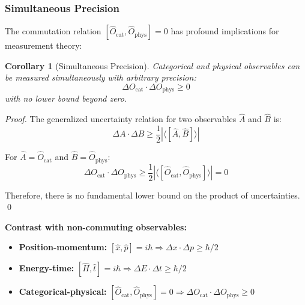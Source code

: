 \documentclass[twocolumn,10pt]{article}
\newtheorem{corollary}[theorem]{Corollary}
\theoremstyle{remark}
\begin{document}
\subsubsection{Simultaneous Precision}

The commutation relation $[\hat{O}_{\text{cat}}, \hat{O}_{\text{phys}}] = 0$ has profound implications for measurement theory:

\begin{corollary}[Simultaneous Precision]
\label{cor:simultaneous_precision}
Categorical and physical observables can be measured simultaneously with arbitrary precision:
\begin{equation}
    \Delta O_{\text{cat}} \cdot \Delta O_{\text{phys}} \geq 0
    \label{eq:no_uncertainty_bound}
\end{equation}
with no lower bound beyond zero.
\end{corollary}

\begin{proof}
The generalized uncertainty relation for two observables $\hat{A}$ and $\hat{B}$ is:
\begin{equation}
    \Delta A \cdot \Delta B \geq \frac{1}{2} |\langle [\hat{A}, \hat{B}] \rangle|
    \label{eq:generalized_uncertainty}
\end{equation}

For $\hat{A} = \hat{O}_{\text{cat}}$ and $\hat{B} = \hat{O}_{\text{phys}}$:
\begin{equation}
    \Delta O_{\text{cat}} \cdot \Delta O_{\text{phys}} \geq \frac{1}{2} |\langle [\hat{O}_{\text{cat}}, \hat{O}_{\text{phys}}] \rangle| = 0
    \label{eq:categorical_uncertainty}
\end{equation}

Therefore, there is no fundamental lower bound on the product of uncertainties. \qed
\end{proof}

\textbf{Contrast with non-commuting observables:}
\begin{itemize}
    \item \textbf{Position-momentum:} $[\hat{x}, \hat{p}] = i\hbar \Rightarrow \Delta x \cdot \Delta p \geq \hbar/2$
    \item \textbf{Energy-time:} $[\hat{H}, \hat{t}] = i\hbar \Rightarrow \Delta E \cdot \Delta t \geq \hbar/2$
    \item \textbf{Categorical-physical:} $[\hat{O}_{\text{cat}}, \hat{O}_{\text{phys}}] = 0 \Rightarrow \Delta O_{\text{cat}} \cdot \Delta O_{\text{phys}} \geq 0$
\end{itemize}
\end{document}
